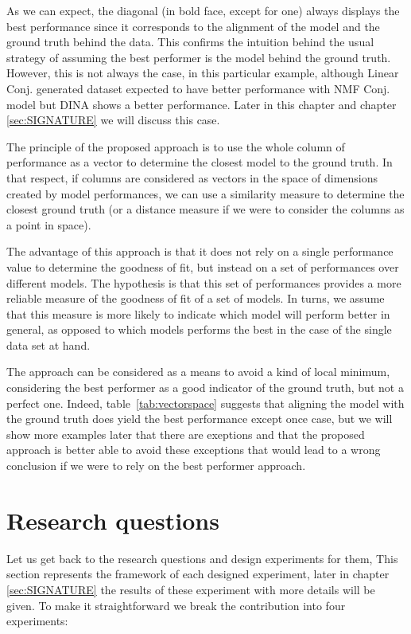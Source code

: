 As we can expect, the diagonal (in bold face, except for one) always displays the best performance since it corresponds to the alignment of the model and the ground truth behind the data.  This confirms the intuition behind the usual strategy of assuming the best performer is the model behind the ground truth.  However, this is not always the case, in this particular example, although Linear Conj. generated dataset expected to have  better performance with NMF Conj. model but DINA shows a better performance. Later in this chapter and chapter \ref{sec:SIGNATURE} we will discuss this case.



The principle of the proposed approach is to use the whole column of performance as a vector to determine the closest model to the ground truth.  In that respect, if columns are considered as vectors in the space of dimensions created by model performances, we can use a similarity measure to determine the closest ground truth (or a distance measure if we were to consider the columns as a point in space).

The advantage of this approach is that it does not rely on a single performance value to determine the goodness of fit, but instead on a set of performances over different models.  The hypothesis is that this set of performances provides a more reliable measure of the goodness of fit of a set of models.  In turns, we assume that this measure is more likely to indicate which model will perform better in general, as opposed to which models performs the best in the case of the single data set at hand.  

The approach can be considered as a means to avoid a kind of local minimum, considering the best performer as a good indicator of the ground truth, but not a perfect one. Indeed, table~\ref{tab:vectorspace} suggests that aligning the model with the ground truth does yield the best performance except once case, but we will show more examples later that there are exeptions and that the proposed approach is better able to avoid these exceptions that would lead to a wrong conclusion if we were to rely on the best performer approach.


\section{Research questions}

Let us get back to the research questions and design experiments for them, This section represents the framework of each designed experiment, later in chapter \ref{sec:SIGNATURE} the results of these experiment with more details will be given. To make it straightforward we break the contribution into four experiments:

